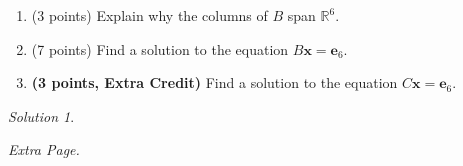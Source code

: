 \documentclass{article}
\theoremstyle{remark}
\newtheorem*{solution}{Solution}
\newcommand{\vv}[1]{\mathbf{#1}}
\newcommand{\R}{\mathbb R}
\begin{document}
\begin{enumerate}
\item (3 points) Explain why the columns of $B$ span $\R^6$.
\item (7 points) Find a solution to the equation $B \vv x = \vv e_6$.
\item \textbf{(3 points, Extra Credit)} Find a solution to the equation $C \vv x = \vv e_6$.
\end{enumerate}

\begin{solution}
\end{solution}

\pagebreak
\noindent\textit{Extra Page.}
\end{document}
